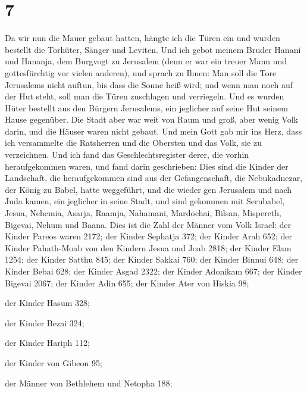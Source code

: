 \hypertarget{section-6}{%
\section{7}\label{section-6}}

 Da wir nun die Mauer gebaut hatten, hängte ich die Türen
ein und wurden bestellt die Torhüter, Sänger und Leviten. 
Und ich gebot meinem Bruder Hanani und Hananja, dem Burgvogt zu
Jerusalem (denn er war ein treuer Mann und gottesfürchtig vor vielen
anderen),  und sprach zu Ihnen: Man soll die Tore
Jerusalems nicht auftun, bis dass die Sonne heiß wird; und wenn man noch
auf der Hut steht, soll man die Türen zuschlagen und verriegeln. Und es
wurden Hüter bestellt aus den Bürgern Jerusalems, ein jeglicher auf
seine Hut seinem Hause gegenüber.  Die Stadt aber war weit
von Raum und groß, aber wenig Volk darin, und die Häuser waren nicht
gebaut.  Und mein Gott gab mir ins Herz, dass ich
versammelte die Ratsherren und die Obersten und das Volk, sie zu
verzeichnen. Und ich fand das Geschlechtsregister derer, die vorhin
heraufgekommen waren, und fand darin geschrieben:  Dies
sind die Kinder der Landschaft, die heraufgekommen sind aus der
Gefangenschaft, die Nebukadnezar, der König zu Babel, hatte weggeführt,
und die wieder gen Jerusalem und nach Juda kamen, ein jeglicher in seine
Stadt,  und sind gekommen mit Serubabel, Jesua, Nehemia,
Asarja, Raamja, Nahamani, Mardochai, Bilsan, Mispereth, Bigevai, Nehum
und Baana. Dies ist die Zahl der Männer vom Volk Israel: 
der Kinder Pareos waren 2172;  der Kinder Sephatja 372;
 der Kinder Arah 652;  der Kinder
Pahath-Moab von den Kindern Jesua und Joab 2818;  der
Kinder Elam 1254;  der Kinder Satthu 845; 
der Kinder Sakkai 760;  der Kinder Binnui 648;
 der Kinder Bebai 628;  der Kinder Asgad
2322;  der Kinder Adonikam 667;  der
Kinder Bigevai 2067;  der Kinder Adin 655;
 der Kinder Ater von Hiskia 98;

 der Kinder Hasum 328;

 der Kinder Bezai 324;

 der Kinder Hariph 112;

 der Kinder von Gibeon 95;

 der Männer von Bethlehem und Netopha 188;

